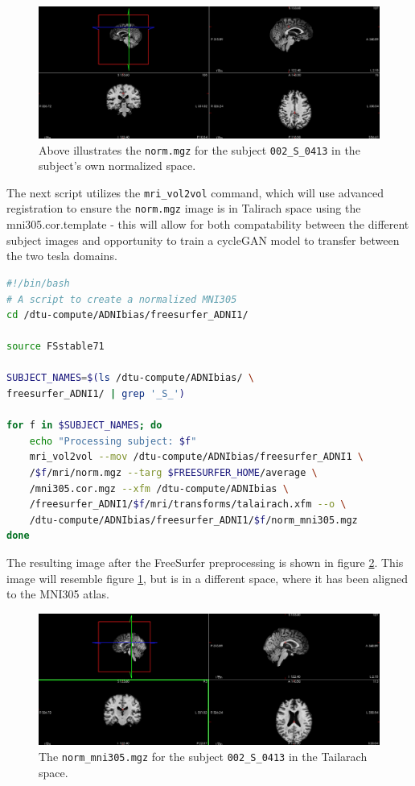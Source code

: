 \documentclass[12pt, fleqn, titlepage]{article}
\begin{document}
\begin{figure}[H]
	\centering
	\includegraphics[width=0.9\linewidth]{imgs/norm}
	\caption{Above illustrates the \texttt{norm.mgz} for the subject \texttt{002\_S\_0413} in the subject's own normalized space.} 
	\label{fig:norm}
\end{figure}

The next script utilizes the \texttt{mri\_vol2vol} command, which will use advanced registration to ensure the \texttt{norm.mgz} image is in Talirach space using the mni305.cor.template - this will allow for both compatability between the different subject images and opportunity to train a cycleGAN model to transfer between the two tesla domains.

\begin{lstlisting}[language=bash,caption={FreeSurfer mri\_vol2vol}]
#!/bin/bash 
# A script to create a normalized MNI305
cd /dtu-compute/ADNIbias/freesurfer_ADNI1/

source FSstable71

SUBJECT_NAMES=$(ls /dtu-compute/ADNIbias/ \ 
freesurfer_ADNI1/ | grep '_S_')

for f in $SUBJECT_NAMES; do 
	echo "Processing subject: $f"
	mri_vol2vol --mov /dtu-compute/ADNIbias/freesurfer_ADNI1 \
	/$f/mri/norm.mgz --targ $FREESURFER_HOME/average \
	/mni305.cor.mgz --xfm /dtu-compute/ADNIbias \ 
	/freesurfer_ADNI1/$f/mri/transforms/talairach.xfm --o \
	/dtu-compute/ADNIbias/freesurfer_ADNI1/$f/norm_mni305.mgz
done
\end{lstlisting}

\noindent
The resulting image after the FreeSurfer preprocessing is shown in figure \ref{fig:norm305}. This image will resemble figure \ref{fig:norm}, but is in a different space, where it has been aligned to the MNI305 atlas. 

\begin{figure}[H]
	\centering
	\includegraphics[width=0.7\linewidth]{imgs/norm_305}
	\caption{The \texttt{norm\_mni305.mgz} for the subject \texttt{002\_S\_0413} in the Tailarach space.} 
	\label{fig:norm305}
\end{figure}
\end{document}
